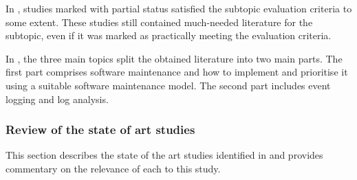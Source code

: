In , studies marked with partial status satisfied the subtopic evaluation criteria to some extent. These studies still contained much-needed literature for the subtopic, even if it was marked as practically meeting the evaluation criteria. \par In , the three main topics split the obtained literature into two main parts. The first part comprises software maintenance and how to implement and prioritise it using a suitable software maintenance model. The second part includes event logging and log analysis. 

\clearpage

\subsubsection{Review of the state of art studies}
This section describes the state of the art studies identified in  and provides commentary on the relevance of each to this study.



\newcommand{\problemStatement}{Software maintenance is a problem in the industry due to how inefficiently developers prioritise maintenance activities. A proven method to monitor software behaviours is event logging. The logging mechanism and log analysis must be explicitly designed for user-based events to improve software maintenance.}

\clearpage


